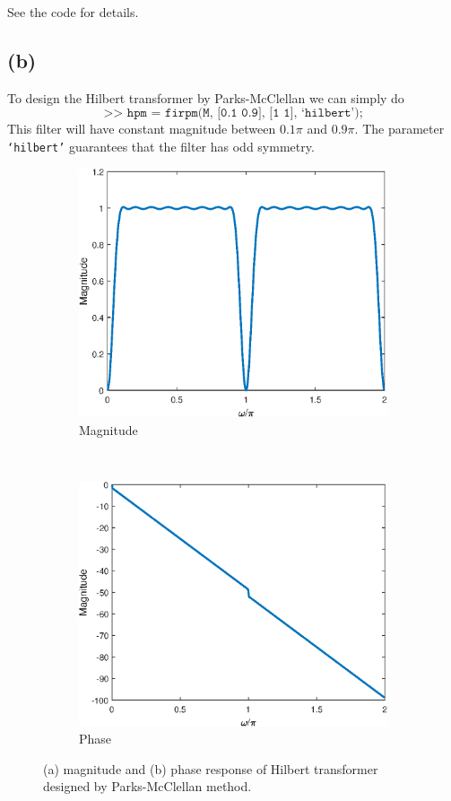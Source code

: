 \documentclass{article}
\begin{document}
See the code for details.

\subsection{(b)}

To design the Hilbert transformer by Parks-McClellan we can simply do
\begin{equation*}
	\texttt{>> hpm = firpm(M, [0.1 0.9], [1 1], `hilbert');}
\end{equation*}
This filter will have constant magnitude between $0.1\pi$ and $0.9\pi$. The parameter \texttt{`hilbert'} guarantees that the filter has odd symmetry.


\FloatBarrier
\begin{figure}[h!]
	\centering
	\begin{subfigure}[h!]{0.5\textwidth}
		\includegraphics[width=\textwidth]{figs/hilbert_pm_mag.eps}
		\caption{Magnitude} 
	\end{subfigure}%
	~ 
	\begin{subfigure}[h!]{0.5\textwidth}
		\includegraphics[width=\textwidth]{figs/hilbert_pm_phase.eps}
		\caption{Phase}
	\end{subfigure}
	\caption{(a) magnitude and (b) phase response of Hilbert transformer designed by Parks-McClellan method.}
\end{figure}
\end{document}
